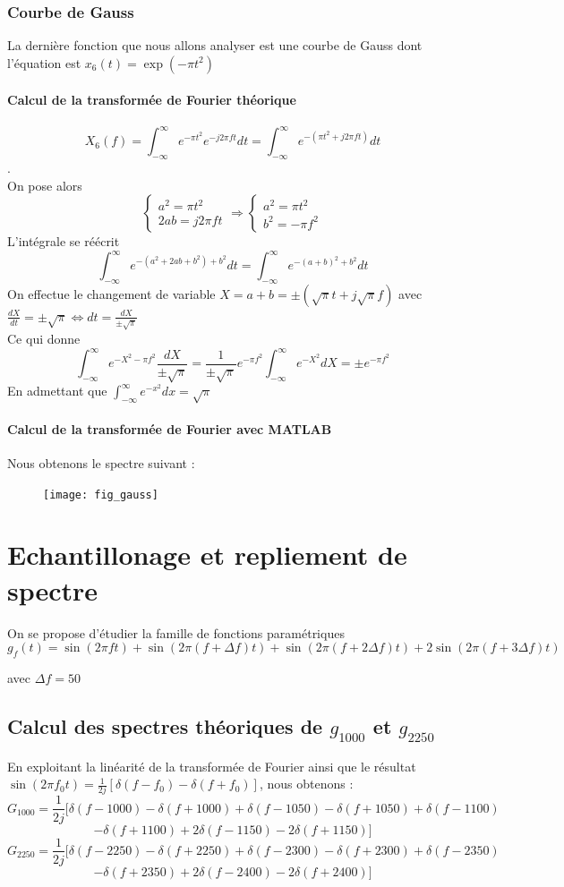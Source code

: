 \documentclass{article}
\begin{document}
\subsubsection{Courbe de Gauss}
La dernière fonction que nous allons analyser est une courbe de Gauss dont l'équation est $x_6(t)=\exp(-\pi t^2)$
\paragraph{Calcul de la transformée de Fourier théorique}
$$X_6(f) = \int_{-\infty}^{\infty}e^{-\pi t^2}e^{-j2\pi ft}dt=\int_{-\infty}^{\infty}e^{-(\pi t^2 +j2\pi ft)}dt$$. \\
On pose alors
$$\left\{\begin{array}{l}
a^2=\pi t^2 \\
2ab = j2\pi ft
\end{array}\right.
\Rightarrow
\left\{
\begin{array}{l}
a^2=\pi t^2 \\
b^2=-\pi f^2
\end{array}
\right.
$$
L'intégrale se réécrit
$$\int_{-\infty}^{\infty}e^{-(a^2+2ab+b^2)+b^2}dt=\int_{-\infty}^{\infty}e^{-(a+b)^2+b^2}dt$$
On effectue le changement de variable $X=a+b=\pm(\sqrt{\pi}t + j\sqrt{\pi}f)$ avec $\frac{dX}{dt}=\pm \sqrt{\pi}\Leftrightarrow dt=\frac{dX}{\pm\sqrt{\pi}}$ \\
Ce qui donne
$$\int_{-\infty}^{\infty}e^{-X^2-\pi f^2}\frac{dX}{\pm\sqrt{\pi}}=\frac{1}{\pm\sqrt{\pi}}e^{-\pi f^2}\int_{-\infty}^{\infty}e^{-X^2}dX=\pm e^{-\pi f^2}$$
En admettant que $\int_{-\infty}^{\infty}e^{-x^2}dx=\sqrt{\pi}$
\paragraph{Calcul de la transformée de Fourier avec MATLAB}
Nous obtenons le spectre suivant :
\begin{figure}[h]
\texttt{[image: fig\_gauss]}
\centering
\end{figure}
\section{Echantillonage et repliement de spectre}
On se propose d'étudier la famille de fonctions paramétriques 
$$g_f(t)=\sin(2\pi f t)+\sin(2\pi(f+\Delta f)t)+\sin(2\pi(f+2\Delta f)t)+2\sin(2\pi(f+3\Delta f)t)$$

avec $\Delta f=50$
\subsection{Calcul des spectres théoriques de $g_{1000}$ et $g_{2250}$}
En exploitant la linéarité de la transformée de Fourier ainsi que le résultat $\sin(2\pi f_0 t)=\frac{1}{2j}[\delta(f-f_0)-\delta(f+f_0)]$, nous obtenons : \\
$$G_{1000}=\frac{1}{2j}[\delta(f-1000)-\delta(f+1000)+\delta(f-1050)-\delta(f+1050)+\delta(f-1100)$$
\flushleft
$$-\delta(f+1100)+2\delta(f-1150)-2\delta(f+1150)]$$
$$G_{2250}=\frac{1}{2j}[\delta(f-2250)-\delta(f+2250)+\delta(f-2300)-\delta(f+2300)+\delta(f-2350)$$
\flushleft
$$-\delta(f+2350)+2\delta(f-2400)-2\delta(f+2400)]$$
\newpage
\end{document}
